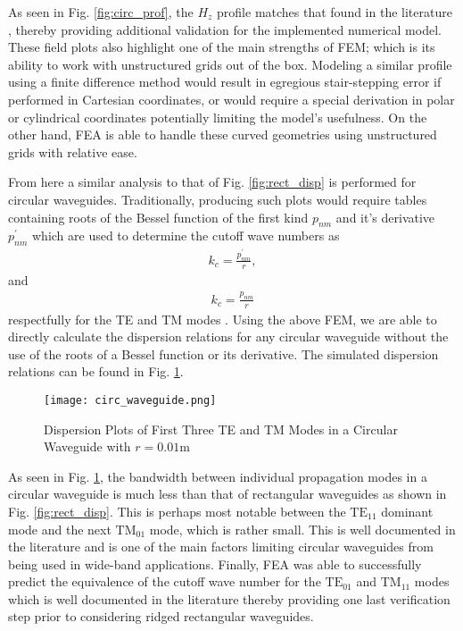 As seen in Fig. \ref{fig:circ_prof}, the $H_z$ profile matches that found in the literature \cite{pozar2011microwave}, thereby providing additional validation for the implemented numerical model. These field plots also highlight one of the main strengths of FEM; which is its ability to work with unstructured grids out of the box. Modeling a similar profile using a finite difference method would result in egregious stair-stepping error if performed in Cartesian coordinates, or would require a special derivation in polar or cylindrical coordinates potentially limiting the model's usefulness. On the other hand, FEA is able to handle these curved geometries using unstructured grids with relative ease. 

From here a similar analysis to that of Fig. \ref{fig:rect_disp} is performed for circular waveguides. Traditionally, producing such plots would require tables containing roots of the Bessel function of the first kind $p_{nm}$ and it's derivative $p^{'}_{nm}$ which are used to determine the cutoff wave numbers as
\begin{align}
	k_c = \frac{p^{'}_{nm}}{r},
\end{align}
and
\begin{align}
	k_c = \frac{p_{nm}}{r}
\end{align}
respectfully for the TE and TM modes \cite{pozar2011microwave}. Using the above FEM, we are able to directly calculate the dispersion relations for any circular waveguide without the use of the roots of a Bessel function or its derivative. The simulated dispersion relations can be found in Fig. \ref{fig:circ_disp}.

\begin{figure}[h!]  
	\centering
	\texttt{[image: circ\_waveguide.png]} 
	\caption{Dispersion Plots of First Three TE and TM Modes in a Circular Waveguide with $r=0.01$m}
	\label{fig:circ_disp}
\end{figure}

As seen in Fig. \ref{fig:circ_disp}, the bandwidth between individual propagation modes in a circular waveguide is much less than that of rectangular waveguides as shown in Fig. \ref{fig:rect_disp}. This is perhaps most notable between the $\mathrm{TE}_{11}$ dominant mode and the next $\mathrm{TM}_{01}$ mode, which is rather small. This is well documented in the literature \cite{cadencecircular} and is one of the main factors limiting circular waveguides from being used in wide-band applications. Finally, FEA was able to successfully predict the equivalence of the cutoff wave number for the  $\mathrm{TE}_{01}$ and $\mathrm{TM}_{11}$ modes which is well documented in the literature \cite{pozar2011microwave} thereby providing one last verification step prior to considering ridged rectangular waveguides.

